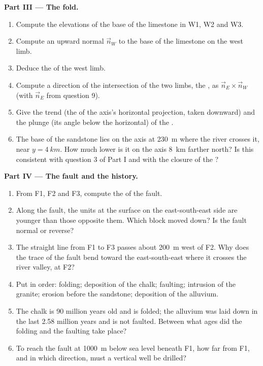 \begin{problem}
\medskip
\noindent\textbf{Part III --- The fold.}
\begin{enumerate}[resume]
  \item Compute the elevations of the base of the limestone in W1, W2 and
        W3.
  \item Compute an upward normal $\vec n_W$ to the base of the limestone on
        the west limb.
  \item Deduce the  of the west limb.
  \item Compute a direction of the intersection of the two limbs, the , as $\vec n_E \times \vec n_W$ (with $\vec n_E$ from question 9).
  \item Give the trend (the  of the axis's horizontal projection,
        taken downward) and the plunge (its angle below the horizontal) of
        the .
  \item The base of the sandstone lies on the axis at \qty{230}{m} where the
        river crosses it, near $y = \qty{4}{km}$. How much lower is it on the
        axis \qty{8}{km} farther north? Is this consistent with question 3 of
        Part I and with the closure of the ?
\end{enumerate}

\medskip
\noindent\textbf{Part IV --- The fault and the history.}
\begin{enumerate}[resume]
  \item From F1, F2 and F3, compute the  of the fault.
  \item Along the fault, the units at the surface on the east-south-east side
        are younger than those opposite them. Which block moved down? Is the
        fault normal or reverse?
  \item The straight line from F1 to F3 passes about \qty{200}{m} west of F2.
        Why does the trace of the fault bend toward the east-south-east where
        it crosses the river valley, at F2?
  \item Put in order: folding; deposition of the chalk; faulting; intrusion
        of the granite; erosion before the sandstone; deposition of the
        alluvium.
  \item The chalk is 90 million years old and is folded; the alluvium was
        laid down in the last 2.58 million years and is not faulted. Between
        what ages did the folding and the faulting take place?
  \item To reach the fault at \qty{1000}{m} below sea level beneath F1, how
        far from F1, and in which direction, must a vertical well be drilled?
\end{enumerate}
\end{problem}

